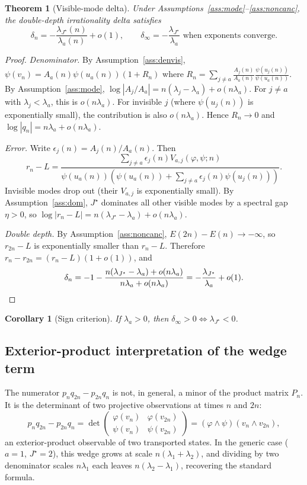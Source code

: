 \documentclass[11pt]{article}
\newtheorem{theorem}{Theorem}
\newtheorem{corollary}{Corollary}
\begin{document}
\begin{theorem}[Visible-mode delta]\label{thm:main}
Under Assumptions~\ref{ass:mode}--\ref{ass:noncanc}, the double-depth irrationality delta satisfies
\[
\delta_n = -\frac{\lambda_{J^\star}(n)}{\lambda_a(n)} + o(1), \qquad \delta_\infty = -\frac{\lambda_{J^\star}}{\lambda_a} \text{ when exponents converge.}
\]
\end{theorem}

\begin{proof}
\emph{Denominator.} By Assumption~\ref{ass:denvis}, $\psi(v_n) = A_a(n)\psi(u_a(n))(1 + R_n)$ where $R_n = \sum_{j \neq a} \frac{A_j(n)}{A_a(n)} \frac{\psi(u_j(n))}{\psi(u_a(n))}$. By Assumption~\ref{ass:mode}, $\log|A_j/A_a| = n(\lambda_j - \lambda_a) + o(n\lambda_a)$. For $j \neq a$ with $\lambda_j < \lambda_a$, this is $o(n\lambda_a)$. For invisible $j$ (where $\psi(u_j(n))$ is exponentially small), the contribution is also $o(n\lambda_a)$. Hence $R_n \to 0$ and $\log|q_n| = n\lambda_a + o(n\lambda_a)$.

\emph{Error.} Write $\epsilon_j(n) = A_j(n)/A_a(n)$. Then
\[
r_n - L = \frac{\sum_{j \neq a} \epsilon_j(n) V_{a,j}(\varphi, \psi; n)}{\psi(u_a(n))\left(\psi(u_a(n)) + \sum_{j \neq a} \epsilon_j(n) \psi(u_j(n))\right)}.
\]
Invisible modes drop out (their $V_{a,j}$ is exponentially small). By Assumption~\ref{ass:dom}, $J^\star$ dominates all other visible modes by a spectral gap $\eta > 0$, so $\log|r_n - L| = n(\lambda_{J^\star} - \lambda_a) + o(n\lambda_a)$.

\emph{Double depth.} By Assumption~\ref{ass:noncanc}, $E(2n) - E(n) \to -\infty$, so $r_{2n} - L$ is exponentially smaller than $r_n - L$. Therefore $r_n - r_{2n} = (r_n - L)(1 + o(1))$, and
\[
\delta_n = -1 - \frac{n(\lambda_{J^\star} - \lambda_a) + o(n\lambda_a)}{n\lambda_a + o(n\lambda_a)} = -\frac{\lambda_{J^\star}}{\lambda_a} + o(1). \qedhere
\]
\end{proof}

\begin{corollary}[Sign criterion]
If $\lambda_a > 0$, then $\delta_\infty > 0 \iff \lambda_{J^\star} < 0$.
\end{corollary}

\subsection{Exterior-product interpretation of the wedge term}
\label{sec:wedge}

The numerator $p_n q_{2n} - p_{2n} q_n$ is not, in general, a minor of the product matrix $P_n$. It is the determinant of two projective observations at times $n$ and $2n$:
\[
p_n q_{2n} - p_{2n} q_n = \det\begin{pmatrix} \varphi(v_n) & \varphi(v_{2n}) \\ \psi(v_n) & \psi(v_{2n}) \end{pmatrix} = (\varphi \wedge \psi)(v_n \wedge v_{2n}),
\]
an exterior-product observable of two transported states. In the generic case ($a=1$, $J^\star=2$), this wedge grows at scale $n(\lambda_1 + \lambda_2)$, and dividing by two denominator scales $n\lambda_1$ each leaves $n(\lambda_2 - \lambda_1)$, recovering the standard formula.
\end{document}
